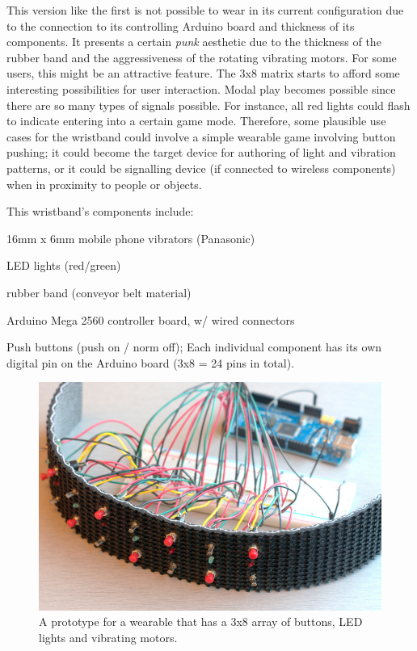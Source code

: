 \documentclass{chi-ext}
\begin{document}
This version like the first is not possible to wear in its current configuration due to the connection to its controlling Arduino board and thickness of its components. It presents a certain \emph{punk} aesthetic due to the thickness of the rubber band and the aggressiveness of the rotating vibrating motors. For some users, this might be an attractive feature. The 3x8 matrix starts to afford some interesting possibilities for user interaction. Modal play becomes possible since there are so many types of signals possible. For instance, all red lights could flash to indicate entering into a certain game mode. Therefore, some plausible use cases for the wristband could involve a simple wearable game involving button pushing; it could become the target device for authoring of light and vibration patterns, or it could be signalling device (if connected to wireless components) when in proximity to people or objects.

This wristband's components include:
\begin{inparaenum}
\item 16mm x 6mm mobile phone vibrators (Panasonic)
\item LED lights (red/green)
\item rubber band (conveyor belt material)
\item Arduino Mega 2560 controller board, w/ wired connectors
\item Push buttons (push on / norm off); Each individual component has its own digital pin on the Arduino board (3x8 = 24 pins in total).
\end{inparaenum}

\begin{figure}
  \begin{center}
  \includegraphics[width=\columnwidth]{images/P1130396.jpg}
  \caption{A prototype for a wearable that has a 3x8 array of buttons, LED lights and vibrating motors.}
  \label{fig:marginparsample}
  \end{center}  
\end{figure}
\end{document}
